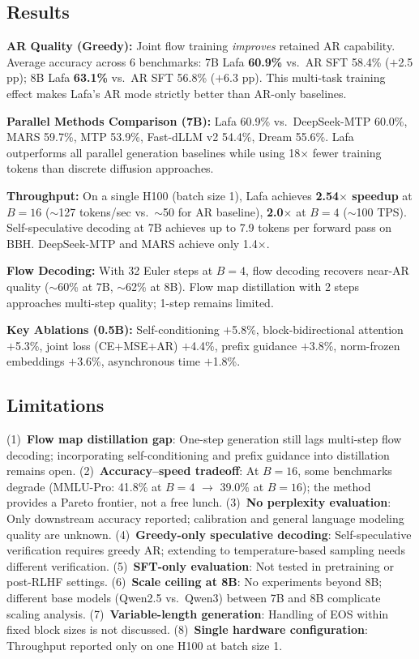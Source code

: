 \documentclass[11pt,a4paper]{article}
\begin{document}
\subsection{Results}
\textbf{AR Quality (Greedy):} Joint flow training \emph{improves} retained AR capability. Average accuracy across 6 benchmarks: 7B Lafa \textbf{60.9\%} vs.\ AR SFT 58.4\% ($+$2.5 pp); 8B Lafa \textbf{63.1\%} vs.\ AR SFT 56.8\% ($+$6.3 pp). This multi-task training effect makes Lafa's AR mode strictly better than AR-only baselines.

\textbf{Parallel Methods Comparison (7B):} Lafa 60.9\% vs.\ DeepSeek-MTP 60.0\%, MARS 59.7\%, MTP 53.9\%, Fast-dLLM v2 54.4\%, Dream 55.6\%. Lafa outperforms all parallel generation baselines while using 18$\times$ fewer training tokens than discrete diffusion approaches.

\textbf{Throughput:} On a single H100 (batch size 1), Lafa achieves \textbf{2.54$\times$ speedup} at $B{=}16$ ($\sim$127 tokens/sec vs.\ $\sim$50 for AR baseline), \textbf{2.0$\times$} at $B{=}4$ ($\sim$100 TPS). Self-speculative decoding at 7B achieves up to 7.9 tokens per forward pass on BBH. DeepSeek-MTP and MARS achieve only 1.4$\times$.

\textbf{Flow Decoding:} With 32 Euler steps at $B{=}4$, flow decoding recovers near-AR quality ($\sim$60\% at 7B, $\sim$62\% at 8B). Flow map distillation with 2 steps approaches multi-step quality; 1-step remains limited.

\textbf{Key Ablations (0.5B):} Self-conditioning $+$5.8\%, block-bidirectional attention $+$5.3\%, joint loss (CE+MSE+AR) $+$4.4\%, prefix guidance $+$3.8\%, norm-frozen embeddings $+$3.6\%, asynchronous time $+$1.8\%.

\subsection{Limitations}
(1)~\textbf{Flow map distillation gap}: One-step generation still lags multi-step flow decoding; incorporating self-conditioning and prefix guidance into distillation remains open. (2)~\textbf{Accuracy--speed tradeoff}: At $B{=}16$, some benchmarks degrade (MMLU-Pro: 41.8\% at $B{=}4$ $\to$ 39.0\% at $B{=}16$); the method provides a Pareto frontier, not a free lunch. (3)~\textbf{No perplexity evaluation}: Only downstream accuracy reported; calibration and general language modeling quality are unknown. (4)~\textbf{Greedy-only speculative decoding}: Self-speculative verification requires greedy AR; extending to temperature-based sampling needs different verification. (5)~\textbf{SFT-only evaluation}: Not tested in pretraining or post-RLHF settings. (6)~\textbf{Scale ceiling at 8B}: No experiments beyond 8B; different base models (Qwen2.5 vs.\ Qwen3) between 7B and 8B complicate scaling analysis. (7)~\textbf{Variable-length generation}: Handling of EOS within fixed block sizes is not discussed. (8)~\textbf{Single hardware configuration}: Throughput reported only on one H100 at batch size 1.
\end{document}
